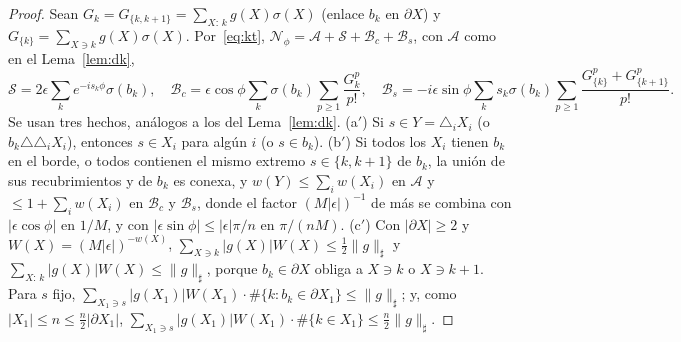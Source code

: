\documentclass[11pt,a4paper]{article}
\theoremstyle{remark}
\begin{document}
\begin{proof}
Sean $G_k=G_{\{k,k+1\}}=\sum_{X:\,k}g(X)\sigma(X)$ (enlace $b_k$ en $\partial X$) y
$G_{\{k\}}=\sum_{X\ni k}g(X)\sigma(X)$.
Por~\eqref{eq:kt}, $\mathcal N_\phi=\mathcal A+\mathcal S+\mathcal B_c+\mathcal B_s$, con $\mathcal A$ como en el
Lema~\ref{lem:dk},
\[
  \mathcal S=2\epsilon\sum_ke^{-is_k\phi}\sigma(b_k),\quad
  \mathcal B_c=\epsilon\cos\phi\sum_k\sigma(b_k)\sum_{p\ge1}\frac{G_k^p}{p!},\quad
  \mathcal B_s=-i\epsilon\sin\phi\sum_ks_k\sigma(b_k)\sum_{p\ge1}\frac{G_{\{k\}}^p+G_{\{k+1\}}^p}{p!}.
\]
Se usan tres hechos, análogos a los del Lema~\ref{lem:dk}.
(a$'$) Si $s\in Y=\triangle_iX_i$ (o $b_k\triangle\triangle_iX_i$), entonces $s\in X_i$ para algún $i$
(o $s\in b_k$).
(b$'$) Si todos los $X_i$ tienen $b_k$ en el borde, o todos contienen el mismo extremo $s\in\{k,k{+}1\}$
de $b_k$, la unión de sus
recubrimientos y de $b_k$ es conexa, y $w(Y)\le\sum_iw(X_i)$ en $\mathcal A$ y $\le1+\sum_iw(X_i)$ en
$\mathcal B_c$ y $\mathcal B_s$, donde el factor $(M|\epsilon|)^{-1}$ de más se combina con $|\epsilon\cos\phi|$
en $1/M$, y con $|\epsilon\sin\phi|\le|\epsilon|\pi/n$ en $\pi/(nM)$.
(c$'$) Con $|\partial X|\ge2$ y $W(X)=(M|\epsilon|)^{-w(X)}$,
$\sum_{X\ni k}|g(X)|W(X)\le\tfrac12\|g\|_\sharp$ y $\sum_{X:\,k}|g(X)|W(X)\le\|g\|_\sharp$, porque
$b_k\in\partial X$ obliga a $X\ni k$ o $X\ni k{+}1$. Para $s$ fijo,
$\sum_{X_1\ni s}|g(X_1)|W(X_1)\cdot\#\{k:b_k\in\partial X_1\}\le\|g\|_\sharp$; y, como $|X_1|\le n\le\tfrac n2|\partial X_1|$,
$\sum_{X_1\ni s}|g(X_1)|W(X_1)\cdot\#\{k\in X_1\}\le\tfrac n2\|g\|_\sharp$.


\end{proof}
\end{document}

